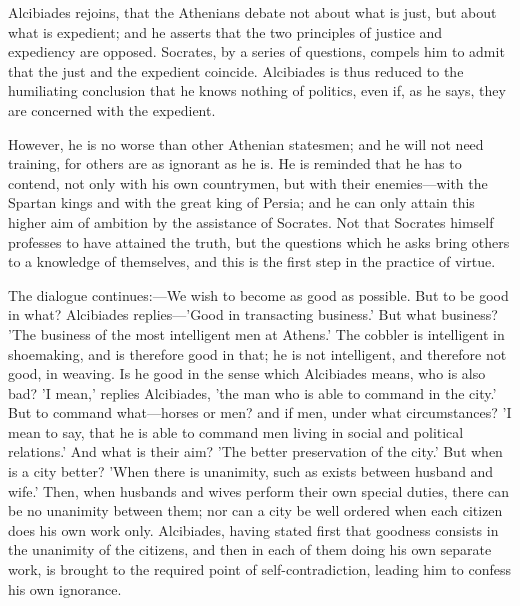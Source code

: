 \documentclass[11pt,letter]{article}
\begin{document}
\par  Alcibiades rejoins, that the Athenians debate not about what is just, but about what is expedient; and he asserts that the two principles of justice and expediency are opposed. Socrates, by a series of questions, compels him to admit that the just and the expedient coincide. Alcibiades is thus reduced to the humiliating conclusion that he knows nothing of politics, even if, as he says, they are concerned with the expedient.

\par  However, he is no worse than other Athenian statesmen; and he will not need training, for others are as ignorant as he is. He is reminded that he has to contend, not only with his own countrymen, but with their enemies—with the Spartan kings and with the great king of Persia; and he can only attain this higher aim of ambition by the assistance of Socrates. Not that Socrates himself professes to have attained the truth, but the questions which he asks bring others to a knowledge of themselves, and this is the first step in the practice of virtue.

\par  The dialogue continues:—We wish to become as good as possible. But to be good in what? Alcibiades replies—'Good in transacting business.' But what business? 'The business of the most intelligent men at Athens.' The cobbler is intelligent in shoemaking, and is therefore good in that; he is not intelligent, and therefore not good, in weaving. Is he good in the sense which Alcibiades means, who is also bad? 'I mean,' replies Alcibiades, 'the man who is able to command in the city.' But to command what—horses or men? and if men, under what circumstances? 'I mean to say, that he is able to command men living in social and political relations.' And what is their aim? 'The better preservation of the city.' But when is a city better? 'When there is unanimity, such as exists between husband and wife.' Then, when husbands and wives perform their own special duties, there can be no unanimity between them; nor can a city be well ordered when each citizen does his own work only. Alcibiades, having stated first that goodness consists in the unanimity of the citizens, and then in each of them doing his own separate work, is brought to the required point of self-contradiction, leading him to confess his own ignorance.
\end{document}
